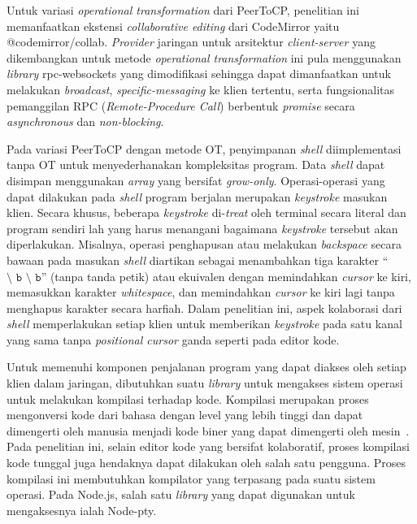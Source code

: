 Untuk variasi \textit{operational transformation} dari PeerToCP, penelitian ini memanfaatkan ekstensi \textit{collaborative editing} dari CodeMirror yaitu @codemirror/collab. \textit{Provider} jaringan untuk arsitektur \textit{client-server} yang dikembangkan untuk metode \textit{operational transformation} ini pula menggunakan \textit{library} rpc-websockets yang dimodifikasi sehingga dapat dimanfaatkan untuk melakukan \textit{broadcast}, \textit{specific-messaging} ke klien tertentu, serta fungsionalitas pemanggilan RPC (\textit{Remote-Procedure Call}) berbentuk \textit{promise} secara \textit{asynchronous} dan \textit{non-blocking}.

Pada variasi PeerToCP dengan metode OT, penyimpanan \textit{shell} diimplementasi tanpa OT untuk menyederhanakan kompleksitas program. Data \textit{shell} dapat disimpan menggunakan \textit{array} yang bersifat \textit{grow-only}. Operasi-operasi yang dapat dilakukan pada \textit{shell} program berjalan merupakan \textit{keystroke} masukan klien. Secara khusus, beberapa \textit{keystroke} di-\textit{treat} oleh terminal secara literal dan program sendiri lah yang harus menangani bagaimana \textit{keystroke} tersebut akan diperlakukan. Misalnya, operasi penghapusan atau melakukan \textit{backspace} secara bawaan pada masukan \textit{shell} diartikan sebagai menambahkan tiga karakter ``$\texttt{\char`\\ b \char`\\ b}$'' (tanpa tanda petik) atau ekuivalen dengan memindahkan \textit{cursor} ke kiri, memasukkan karakter \textit{whitespace}, dan memindahkan \textit{cursor} ke kiri lagi tanpa menghapus karakter secara harfiah. Dalam penelitian ini, aspek kolaborasi dari \textit{shell} memperlakukan setiap klien untuk memberikan \textit{keystroke} pada satu kanal yang sama tanpa \textit{positional cursor} ganda seperti pada editor kode.

Untuk memenuhi komponen penjalanan program yang dapat diakses oleh setiap klien dalam jaringan, dibutuhkan suatu \textit{library} untuk mengakses sistem operasi untuk melakukan kompilasi terhadap kode. Kompilasi merupakan proses mengonversi kode dari bahasa dengan level yang lebih tinggi dan dapat dimengerti oleh manusia menjadi kode biner yang dapat dimengerti oleh mesin~\citep{aho1985compilers}. Pada penelitian ini, selain editor kode yang bersifat kolaboratif, proses kompilasi kode tunggal juga hendaknya dapat dilakukan oleh salah satu pengguna. Proses kompilasi ini membutuhkan kompilator yang terpasang pada suatu sistem operasi. Pada Node.js, salah satu \textit{library} yang dapat digunakan untuk mengaksesnya ialah Node-pty.

